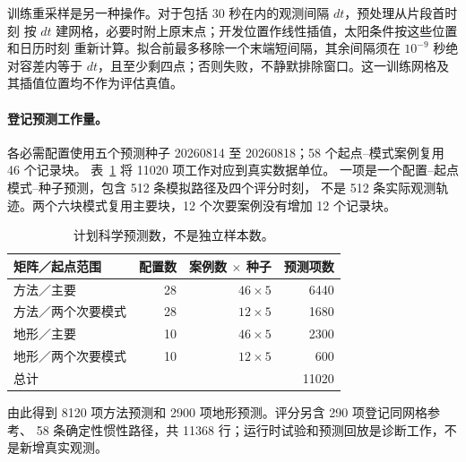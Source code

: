 训练重采样是另一种操作。对于包括 30 秒在内的观测间隔 \(dt\)，预处理从片段首时刻
按 \(dt\) 建网格，必要时附上原末点；开发位置作线性插值，太阳条件按这些位置和日历时刻
重新计算。拟合前最多移除一个末端短间隔，其余间隔须在 \(10^{-9}\) 秒绝对容差内等于
\(dt\)，且至少剩四点；否则失败，不静默排除窗口。这一训练网格及其插值位置均不作为评估真值。

\paragraph{登记预测工作量。}\label{sec:forecast-inventory}\hypertarget{sec:forecast-inventory}{}
各必需配置使用五个预测种子 20260814 至 20260818；58 个起点--模式案例复用 46 个记录块。
表~\ref{tab:forecast-counts} 将 11020 项工作对应到真实数据单位。
一项是一个配置--起点模式--种子预测，包含 512 条模拟路径及四个评分时刻，
不是 512 条实际观测轨迹。两个六块模式复用主要块，12 个次要案例没有增加 12 个记录块。
\begin{table}[htbp]
\centering\small
\caption{计划科学预测数，不是独立样本数。}
\label{tab:forecast-counts}\hypertarget{tab:forecast-counts}{}
\begin{tabular}{@{}lrrr@{}}
\toprule
矩阵／起点范围 & 配置数 & 案例数 $\times$ 种子 & 预测项数\\
\midrule
方法／主要 & 28 & $46\times5$ & 6440\\
方法／两个次要模式 & 28 & $12\times5$ & 1680\\
地形／主要 & 10 & $46\times5$ & 2300\\
地形／两个次要模式 & 10 & $12\times5$ & 600\\
\midrule
总计 & & & 11020\\
\bottomrule
\end{tabular}
\end{table}
由此得到 8120 项方法预测和 2900 项地形预测。评分另含 290 项登记同网格参考、
58 条确定性惯性路径，共 11368 行；运行时试验和预测回放是诊断工作，不是新增真实观测。


